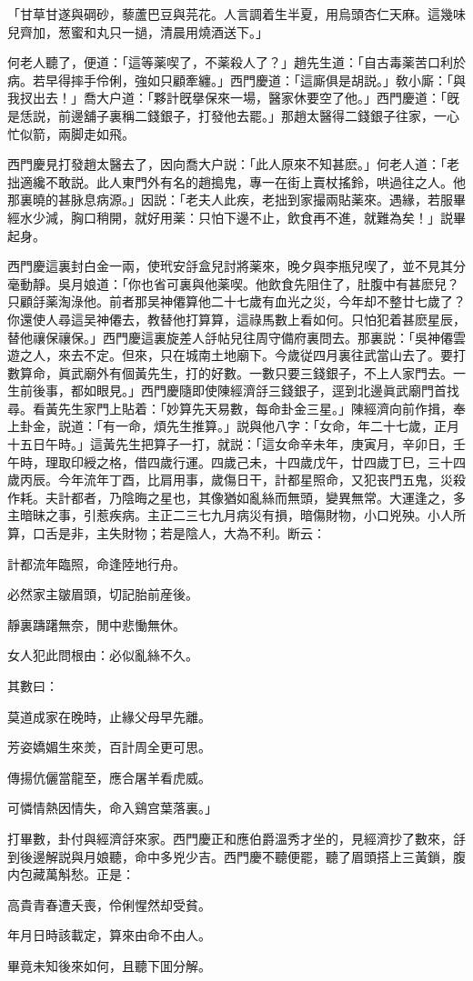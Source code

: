 「甘草甘遂與碙砂，藜蘆巴豆與芫花。人言調着生半夏，用烏頭杏仁天麻。這幾味兒齊加，葱蜜和丸只一撾，清晨用燒酒送下。」

何老人聽了，便道：「這等薬喫了，不薬殺人了？」趙先生道：「自古毒薬苦口利於病。若早得摔手伶俐，強如只顧牽纏。」西門慶道：「這廝俱是胡説。」敎小廝：「與我扠出去！」喬大户道：「夥計旣擧保來一場，醫家休要空了他。」西門慶道：「旣是恁説，前邊舖子裏稱二錢銀子，打發他去罷。」那趙太醫得二錢銀子往家，一心忙似箭，兩脚走如飛。

西門慶見打發趙太醫去了，因向喬大户説：「此人原來不知甚麽。」何老人道：「老拙適纔不敢説。此人東門外有名的趙搗鬼，專一在街上賣杖搖鈴，哄過往之人。他那裏曉的甚脉息病源。」因説：「老夫人此疾，老拙到家撮兩貼薬來。遇緣，若服畢經水少減，胸口稍開，就好用薬：只怕下邊不止，飲食再不進，就難為矣！」説畢起身。

西門慶這裏封白金一兩，使玳安㧱盒兒討將薬來，晚夕與李瓶兒喫了，並不見其分毫動靜。吳月娘道：「你也省可裏與他薬喫。他飲食先阻住了，肚腹中有甚麽兒？只顧㧱薬淘淥他。前者那吴神僊算他二十七歲有血光之災，今年却不整廿七歲了？你還使人尋這吴神僊去，教替他打算算，這祿馬數上看如何。只怕犯着甚麽星辰，替他禳保禳保。」西門慶這裏旋差人㧱帖兒往周守備府裏問去。那裏説：「吳神僊雲遊之人，來去不定。但來，只在城南土地廟下。今歲従四月裏往武當山去了。要打數算命，眞武廟外有個黃先生，打的好數。一數只要三錢銀子，不上人家門去。一生前後事，都如眼見。」西門慶隨即使陳經濟㧱三錢銀子，逕到北邊眞武廟門首找尋。看黃先生家門上貼着：「妙算先天易數，每命卦金三星。」陳經濟向前作揖，奉上卦金，説道：「有一命，煩先生推算。」説與他八字：「女命，年二十七歲，正月十五日午時。」這黃先生把算子一打，就説：「這女命辛未年，庚寅月，辛卯日，壬午時，理取印綬之格，借四歲行運。四歲己未，十四歲戊午，廿四歲丁巳，三十四歲丙辰。今年流年丁酉，比肩用事，歲傷日干，計都星照命，又犯丧門五鬼，災殺作耗。夫計都者，乃陰晦之星也，其像猶如亂絲而無頭，變異無常。大運逢之，多主暗昧之事，引惹疾病。主正二三七九月病災有損，暗傷財物，小口兇殃。小人所算，口舌是非，主失財物；若是陰人，大為不利。断云：

計都流年臨照，命逢陸地行舟。

必然家主皺眉頭，切記胎前産後。

靜裏躊躇無奈，閒中悲慟無休。

女人犯此問根由：必似亂絲不久。　

其數曰：

莫道成家在晚時，止緣父母早先離。

芳姿嬌媚生來羙，百計周全更可思。

傳揚伉儷當龍至，應合屠羊看虎威。

可憐情熱因情失，命入鷄宫葉落裏。」

打畢數，卦付與經濟㧱來家。西門慶正和應伯爵溫秀才坐的，見經濟抄了數來，㧱到後邊解説與月娘聽，命中多兇少吉。西門慶不聽便罷，聽了眉頭搭上三黃鎖，腹内包藏萬斛愁。正是：

高貴青春遭夭喪，伶俐惺然却受貧。

年月日時該載定，算來由命不由人。

畢竟未知後來如何，且聽下囬分解。

